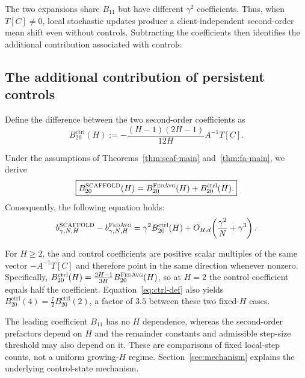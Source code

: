 The two expansions share $B_{11}$ but have different $\gamma^2$ coefficients. Thus, when $T[C]\ne0$, local stochastic updates produce a client-independent second-order mean shift even without controls. Subtracting the coefficients then identifies the additional contribution associated with \Scaf{} controls.

\subsection{The additional contribution of persistent controls}

Define the difference between the two second-order coefficients as
\begin{equation}
\label{eq:ctrl-def}
B_{20}^{\mathrm{ctrl}}(H)
:=-\frac{(H-1)(2H-1)}{12H}A^{-1}T[C].
\end{equation}

\begin{corollary}
\label{cor:attribution}
Under the assumptions of Theorems~\ref{thm:scaf-main} and~\ref{thm:fa-main}, we derive
\begin{equation}
\label{eq:matched-control}
\boxed{B_{20}^{\textnormal{\textsc{SCAFFOLD}}}(H)
=B_{20}^{\textnormal{\textsc{FedAvg}}}(H)+B_{20}^{\mathrm{ctrl}}(H).}
\end{equation}
Consequently, the following equation holds:
\begin{equation}
\label{eq:matched-bias-difference}
b^{\textnormal{\textsc{SCAFFOLD}}}_{\gamma,N,H}-b^{\textnormal{\textsc{FedAvg}}}_{\gamma,N,H}
=\gamma^2B_{20}^{\mathrm{ctrl}}(H)
+O_{H,d}\!\left(\frac{\gamma^2}{N}+\gamma^3\right).
\end{equation}
\end{corollary}

For $H\geq2$, the \FedAvg{} and control coefficients are positive scalar multiples of the same vector $-A^{-1}T[C]$ and therefore point in the same direction whenever nonzero. Specifically,
$B_{20}^{\mathrm{ctrl}}(H)=\frac{2H-1}{3H}B_{20}^{\textnormal{\textsc{FedAvg}}}(H)$,
so at $H=2$ the control coefficient equals half the \FedAvg{} coefficient. Equation~\eqref{eq:ctrl-def} also yields
$B_{20}^{\mathrm{ctrl}}(4)=\tfrac72 B_{20}^{\mathrm{ctrl}}(2)$,
a factor of $3.5$ between these two fixed-$H$ cases.

The leading coefficient $B_{11}$ has no $H$ dependence, whereas the second-order prefactors depend on $H$ and the remainder constants and admissible step-size threshold may also depend on it. These are comparisons of fixed local-step counts, not a uniform growing-$H$ regime. Section~\ref{sec:mechanism} explains the underlying control-state mechanism.

